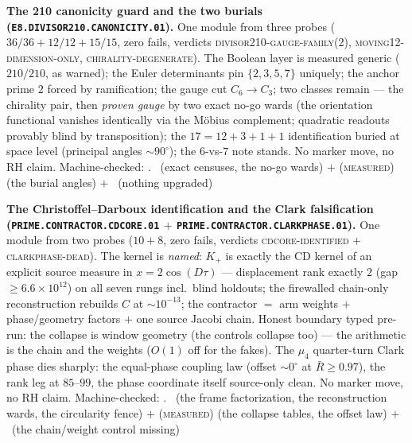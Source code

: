 \documentclass[11pt,a4paper]{article}
\theoremstyle{definition}
\begin{document}
\par\smallskip\noindent\textbf{The 210 canonicity guard and the
two burials
(\texttt{E8.DIVISOR210.\allowbreak CANONICITY.01}).}
One module from three probes ($36/36 + 12/12 + 15/15$, zero
fails, verdicts \textsc{divisor210-gauge-family(2)},
\textsc{moving12-dimension-only},
\textsc{chirality-degenerate}).  The Boolean layer is measured
generic ($210/210$, as warned); the Euler determinants pin
$\{2,3,5,7\}$ uniquely; the anchor prime $2$ forced by
ramification; the gauge cut $C_6 \to C_3$; two classes remain
--- the chirality pair, then \emph{proven gauge} by two exact
no-go wards (the orientation functional vanishes identically
via the M\"obius complement; quadratic readouts provably blind
by transposition); the $17 = 12{+}3{+}1{+}1$ identification
buried at space level (principal angles ${\sim}90^\circ$); the
$6$-vs-$7$ note stands.  No marker move, no RH claim.
Machine-checked: .
\mE\ (exact censuses, the no-go wards) $+$
(\textsc{measured}) (the burial angles) $+$ \mO\ (nothing
upgraded)
\par\smallskip

\par\smallskip\noindent\textbf{The Christoffel--Darboux
identification and the Clark falsification
(\texttt{PRIME.CONTRACTOR.\allowbreak CDCORE.01} $+$
\texttt{PRIME.CONTRACTOR.\allowbreak CLARKPHASE.01}).}
One module from two probes ($10 + 8$, zero fails, verdicts
\textsc{cdcore-identified} $+$ \textsc{clarkphase-dead}).  The
kernel is \emph{named}: $K_+$ is exactly the CD kernel of an
explicit source measure in $x = 2\cos(D\tau)$ --- displacement
rank exactly $2$ (gap $\ge 6.6\times10^{12}$) on all seven rungs
incl.\ blind holdouts; the firewalled chain-only reconstruction
rebuilds $C$ at ${\sim}10^{-13}$; the contractor $=$ arm weights
$+$ phase/geometry factors $+$ one source Jacobi chain.  Honest
boundary typed pre-run: the collapse is window geometry (the
controls collapse too) --- the arithmetic is the chain and the
weights ($O(1)$ off for the fakes).  The $\mu_4$ quarter-turn
Clark phase dies sharply: the equal-phase coupling law (offset
${\sim}0^\circ$ at $\bar R \ge 0.97$), the rank leg at
$85$--$99$, the phase coordinate itself source-only clean.  No
marker move, no RH claim.
Machine-checked: .
\mE\ (the frame factorization, the reconstruction wards, the
circularity fence) $+$ (\textsc{measured}) (the collapse tables,
the offset law) $+$ \mO\ (the chain/weight control missing)
\par\smallskip
\end{document}
